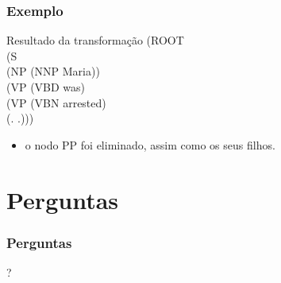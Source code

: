 \documentclass{beamer}
\begin{document}
\begin{frame}\frametitle{Exemplo}
\begin{block}{Resultado da transformação}
(ROOT\\
  (S\\
    (NP (NNP Maria))\\
    (VP (VBD was)\\
      (VP (VBN arrested)\\
    (. .)))\\
\end{block}
\begin{itemize}
\item o nodo PP foi eliminado, assim como os seus filhos.
\end{itemize}
\end{frame}


\section*{Perguntas}
\begin{frame} \frametitle{Perguntas}
\begin{center}\huge{?}\end{center}
\end{frame}
\end{document}
